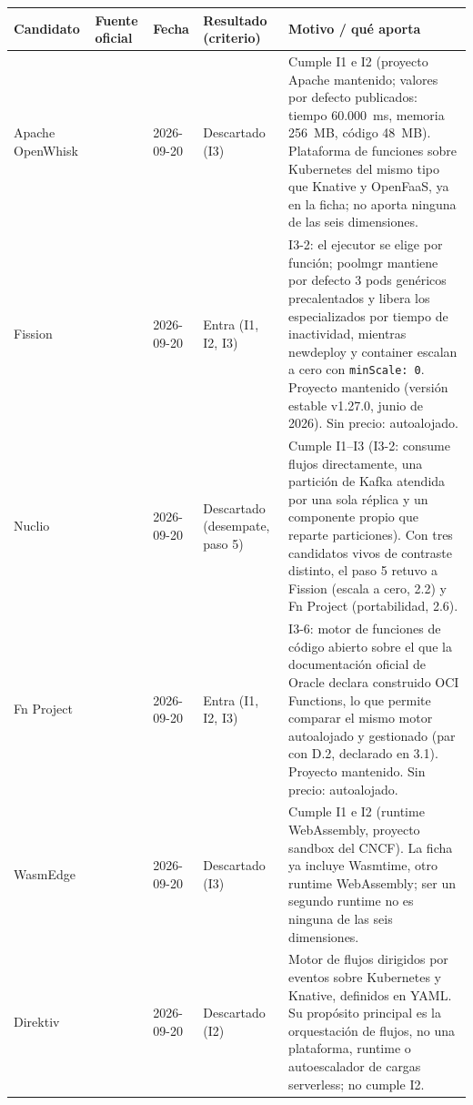\documentclass[12pt, letterpaper, table, xcdraw]{inf-pucv}
\begin{document}
{\scriptsize
\begin{longtable}{|p{2.5cm}|p{2.4cm}|p{1.4cm}|p{2.3cm}|p{5.2cm}|}
    \hline
    \textbf{Candidato} & \textbf{Fuente oficial} & \textbf{Fecha} & \textbf{Resultado (criterio)} & \textbf{Motivo / qué aporta} \\
    \hline
    \endhead
    Apache OpenWhisk & \parencite{openwhisk2026product,openwhisk2026limits} & 2026-09-20 & Descartado (I3) & Cumple I1 e I2 (proyecto Apache mantenido; valores por defecto publicados: tiempo 60.000~ms, memoria 256~MB, código 48~MB). Plataforma de funciones sobre Kubernetes del mismo tipo que Knative y OpenFaaS, ya en la ficha; no aporta ninguna de las seis dimensiones. \\ \hline
    Fission & \parencite{fission2026executors,fission2026releases} & 2026-09-20 & Entra (I1, I2, I3) & I3-2: el ejecutor se elige por función; poolmgr mantiene por defecto 3 pods genéricos precalentados y libera los especializados por tiempo de inactividad, mientras newdeploy y container escalan a cero con \texttt{minScale: 0}. Proyecto mantenido (versión estable v1.27.0, junio de 2026). Sin precio: autoalojado. \\ \hline
    Nuclio & \parencite{nuclio2026architecture,nuclio2026triggers,nuclio2026kafka,nuclio2026releases} & 2026-09-20 & Descartado (desempate, paso 5) & Cumple I1--I3 (I3-2: consume flujos directamente, una partición de Kafka atendida por una sola réplica y un componente propio que reparte particiones). Con tres candidatos vivos de contraste distinto, el paso 5 retuvo a Fission (escala a cero, 2.2) y Fn Project (portabilidad, 2.6). \\ \hline
    Fn Project & \parencite{fnproject2026product,oracle2026fnoverview} & 2026-09-20 & Entra (I1, I2, I3) & I3-6: motor de funciones de código abierto sobre el que la documentación oficial de Oracle declara construido OCI Functions, lo que permite comparar el mismo motor autoalojado y gestionado (par con D.2, declarado en 3.1). Proyecto mantenido. Sin precio: autoalojado. \\ \hline
    WasmEdge & \parencite{wasmedge2026site,cncf2026wasmedge} & 2026-09-20 & Descartado (I3) & Cumple I1 e I2 (runtime WebAssembly, proyecto sandbox del CNCF). La ficha ya incluye Wasmtime, otro runtime WebAssembly; ser un segundo runtime no es ninguna de las seis dimensiones. \\ \hline
    Direktiv & \parencite{direktiv2026docs,direktiv2026github,direktiv2026landscape} & 2026-09-20 & Descartado (I2) & Motor de flujos dirigidos por eventos sobre Kubernetes y Knative, definidos en YAML. Su propósito principal es la orquestación de flujos, no una plataforma, runtime o autoescalador de cargas serverless; no cumple I2. \\ \hline

\end{longtable}}
\end{document}
